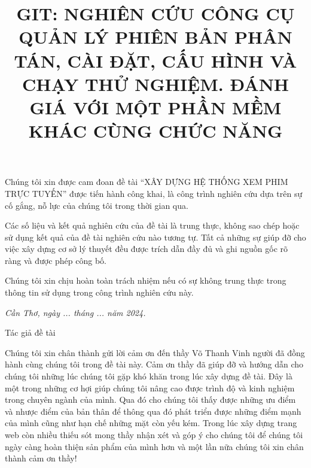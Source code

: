 \documentclass[a4paper,oneside]{extbook}
\title{GIT: NGHIÊN CỨU CÔNG CỤ QUẢN LÝ PHIÊN BẢN PHÂN TÁN, CÀI ĐẶT, CẤU HÌNH VÀ CHẠY THỬ NGHIỆM. ĐÁNH GIÁ VỚI MỘT PHẦN MỀM KHÁC CÙNG CHỨC NĂNG}
\begin{document}

\captionsetup[figure]{font=bf}
\captionsetup[table]{
  font=bf,
  justification=raggedright,
  singlelinecheck=false
}


\coverpage
\setlength{\parindent}{1cm}
\frontmatter

\begin{declaration}

Chúng tôi xin được cam đoan đề tài “XÂY DỰNG HỆ THỐNG XEM PHIM TRỰC TUYẾN” được
tiến hành công khai, là công trình nghiên cứu dựa trên sự cố gắng, nỗ lực của chúng tôi trong thời gian qua.

Các số liệu và kết quả nghiên cứu của đề tài là trung thực, không sao chép hoặc sử
dụng kết quả của đề tài nghiên cứu nào tương tự. Tất cả những sự giúp đỡ cho việc
xây dựng cơ sở lý thuyết đều được trích dẫn đầy đủ và ghi nguồn gốc rõ ràng và được
phép công bố.

Chúng tôi xin chịu hoàn toàn trách nhiệm nếu có sự không trung thực trong thông tin sử
dụng trong công trình nghiên cứu này.

\hfill %
\begin{minipage}{0.5\textwidth}

\begin{center}
\textit{Cần Thơ, ngày ... tháng ... năm 2024.}

Tác giả đề tài    
\end{center}

\end{minipage}

\end{declaration}

\begin{acknowledgments}
Chúng tôi xin chân thành gửi lời cảm ơn đến thầy Võ Thanh Vinh người đã đồng
hành cùng chúng tôi trong đề tài này. Cảm ơn thầy đã giúp đỡ và hướng dẫn cho chúng tôi những
lúc chúng tôi gặp khó khăn trong lúc xây dựng đề tài. Đây là một trong những cơ hợi giúp
chúng tôi nâng cao được trình độ và kinh nghiệm trong chuyên ngành của mình. Qua đó
cho chúng tôi thấy được những ưu điểm và nhược điểm của bản thân để thông qua đó phát
triển được những điểm mạnh của mình cũng như hạn chế những mặt còn yếu kém.
Trong lúc xây dựng trang web còn nhiều thiếu sót mong thầy nhận xét và góp ý cho chúng tôi
để chúng tôi ngày càng hoàn thiện sản phẩm của mình hơn và một lần nữa chúng tôi xin chân
thành cảm ơn thầy!
\end{acknowledgments}
\end{document}
